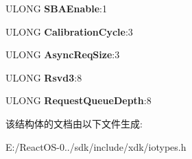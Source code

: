 \begin{DoxyCompactItemize}
U\+L\+O\+NG {\bfseries S\+B\+A\+Enable}\+:1
\item 
\mbox{\label{struct___p_c_i___a_g_p___c_a_p_a_b_i_l_i_t_y_1_1___p_c_i___a_g_p___c_o_m_m_a_n_d_a651b51855578aca0d6777189344baa9a}} 
U\+L\+O\+NG {\bfseries Calibration\+Cycle}\+:3
\item 
\mbox{\label{struct___p_c_i___a_g_p___c_a_p_a_b_i_l_i_t_y_1_1___p_c_i___a_g_p___c_o_m_m_a_n_d_a3a37d46c5ed57243d48fdfdbc0f7afa8}} 
U\+L\+O\+NG {\bfseries Async\+Req\+Size}\+:3
\item 
\mbox{\label{struct___p_c_i___a_g_p___c_a_p_a_b_i_l_i_t_y_1_1___p_c_i___a_g_p___c_o_m_m_a_n_d_a9c548b1e0d2905be64a179dcf5bc0847}} 
U\+L\+O\+NG {\bfseries Rsvd3}\+:8
\item 
\mbox{\label{struct___p_c_i___a_g_p___c_a_p_a_b_i_l_i_t_y_1_1___p_c_i___a_g_p___c_o_m_m_a_n_d_a80de7fb6118706c2ba4c6533c4bd684a}} 
U\+L\+O\+NG {\bfseries Request\+Queue\+Depth}\+:8
\end{DoxyCompactItemize}


该结构体的文档由以下文件生成\+:\begin{DoxyCompactItemize}
\item 
E\+:/\+React\+O\+S-\/0../sdk/include/xdk/iotypes.\+h\end{DoxyCompactItemize}

